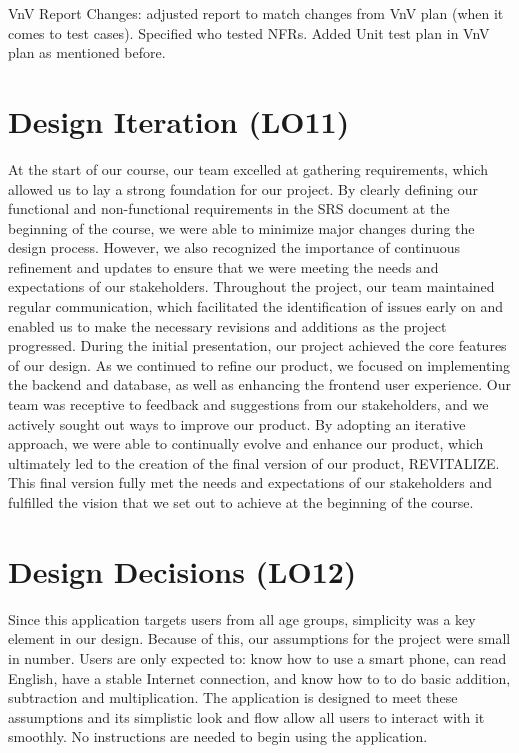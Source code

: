 \documentclass{article}
\begin{document}
VnV Report Changes: adjusted report to match changes from VnV plan (when it comes to test cases). Specified who tested NFRs. Added Unit test plan in VnV plan as mentioned before.

\section{Design Iteration (LO11)}

At the start of our course, our team excelled at gathering requirements, which allowed us to lay a strong foundation for our project. By clearly defining our functional and non-functional requirements in the SRS document at the beginning of the course, we were able to minimize major changes during the design process. However, we also recognized the importance of continuous refinement and updates to ensure that we were meeting the needs and expectations of our stakeholders. Throughout the project, our team maintained regular communication, which facilitated the identification of issues early on and enabled us to make the necessary revisions and additions as the project progressed. During the initial presentation, our project achieved the core features of our design. As we continued to refine our product, we focused on implementing the backend and database, as well as enhancing the frontend user experience. Our team was receptive to feedback and suggestions from our stakeholders, and we actively sought out ways to improve our product. By adopting an iterative approach, we were able to continually evolve and enhance our product, which ultimately led to the creation of the final version of our product, REVITALIZE. This final version fully met the needs and expectations of our stakeholders and fulfilled the vision that we set out to achieve at the beginning of the course.

\section{Design Decisions (LO12)}
Since this application targets users from all age groups, simplicity was a key element in our design. Because of this, our assumptions for the project were small in number. Users are only expected to: know how to use a smart phone, can read English, have a stable Internet connection, and know how to to do basic addition, subtraction and multiplication. The application is designed to meet these assumptions and its simplistic look and flow allow all users to interact with it smoothly. No instructions are needed to begin using the application. 
\end{document}
